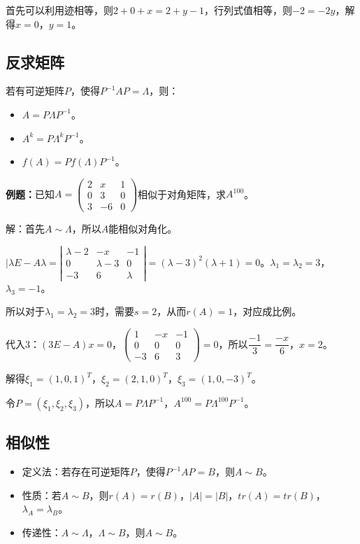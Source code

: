 \documentclass[UTF8, 12pt]{ctexart}
\begin{document}
首先可以利用迹相等，则$2+0+x=2+y-1$，行列式值相等，则$-2=-2y$，解得$x=0$，$y=1$。

\subsection{反求矩阵}

若有可逆矩阵$P$，使得$P^{-1}AP=\Lambda$，则：

\begin{itemize}
    \item $A=P\Lambda P^{-1}$。
    \item $A^k=P\Lambda^kP^{-1}$。
    \item $f(A)=Pf(\Lambda)P^{-1}$。
\end{itemize}

\textbf{例题：}已知$A=\left(\begin{array}{ccc}
    2 & x & 1 \\
    0 & 3 & 0 \\
    3 & -6 & 0
\end{array}\right)$相似于对角矩阵，求$A^{100}$。\medskip

解：首先$A\sim\Lambda$，所以$A$能相似对角化。

$\vert\lambda E-A\lambda=\left|\begin{array}{ccc}
    \lambda-2 & -x & -1 \\
    0 & \lambda-3 & 0 \\
    -3 & 6 & \lambda
\end{array}\right|=(\lambda-3)^2(\lambda+1)=0$。$\lambda_1=\lambda_2=3$，$\lambda_3=-1$。

所以对于$\lambda_1=\lambda_2=3$时，需要$s=2$，从而$r(A)=1$，对应成比例。

代入3：$(3E-A)x=0$，$\left(\begin{array}{ccc}
    1 & -x & -1 \\
    0 & 0 & 0 \\
    -3 & 6 & 3
\end{array}\right)=0$，所以$\dfrac{-1}{3}=\dfrac{-x}{6}$，$x=2$。

解得$\xi_1=(1,0,1)^T$，$\xi_2=(2,1,0)^T$，$\xi_3=(1,0,-3)^T$。

令$P=(\xi_1,\xi_2,\xi_3)$，所以$A=P\Lambda P^{-1}$，$A^{100}=P\Lambda^{100}P^{-1}$。

\subsection{相似性}

\begin{itemize}
    \item 定义法：若存在可逆矩阵$P$，使得$P^{-1}AP=B$，则$A\sim B$。
    \item 性质：若$A\sim B$，则$r(A)=r(B)$，$\vert A\vert=\vert B\vert$，$tr(A)=tr(B)$，$\lambda_A=\lambda_B$。
    \item 传递性：$A\sim\Lambda$，$\Lambda\sim B$，则$A\sim B$。
\end{itemize}
\end{document}
